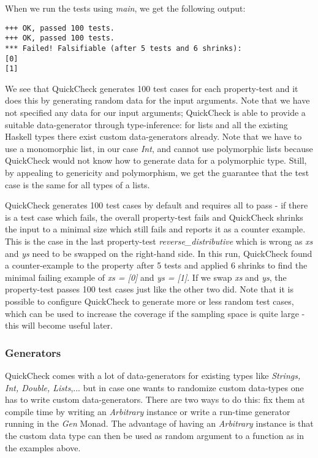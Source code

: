 When we run the tests using \textit{main}, we get the following output:

\begin{verbatim}
+++ OK, passed 100 tests.
+++ OK, passed 100 tests.
*** Failed! Falsifiable (after 5 tests and 6 shrinks):    
[0]
[1]
\end{verbatim}

We see that QuickCheck generates 100 test cases for each property-test and it does this by generating random data for the input arguments. Note that we have not specified any data for our input arguments; QuickCheck is able to provide a suitable data-generator through type-inference: for lists and all the existing Haskell types there exist custom data-generators already. Note that we have to use a monomorphic list, in our case \textit{Int}, and cannot use polymorphic lists because QuickCheck would not know how to generate data for a polymorphic type. Still, by appealing to genericity and polymorphism, we get the guarantee that the test case is the same for all types of a lists.

QuickCheck generates 100 test cases by default and requires all to pass - if there is a test case which fails, the overall property-test fails and QuickCheck shrinks the input to a minimal size which still fails and reports it as a counter example. This is the case in the last property-test \textit{reverse\_distributive} which is wrong as \textit{xs} and \textit{ys} need to be swapped on the right-hand side. In this run, QuickCheck found a counter-example to the property after 5 tests and applied 6 shrinks to find the minimal failing example of \textit{xs = [0]} and \textit{ys = [1]}. If we swap \textit{xs} and \textit{ys}, the property-test passes 100 test cases just like the other two did. Note that it is possible to configure QuickCheck to generate more or less random test cases, which can be used to increase the coverage if the sampling space is quite large - this will become useful later.

\subsubsection*{Generators}
QuickCheck comes with a lot of data-generators for existing types like \textit{Strings, Int, Double, Lists},... but in case one wants to randomize custom data-types one has to write custom data-generators. There are two ways to do this: fix them at compile time by writing an \textit{Arbitrary} instance or write a run-time generator running in the \textit{Gen} Monad. The advantage of having an \textit{Arbitrary} instance is that the custom data type can then be used as random argument to a function as in the examples above.

